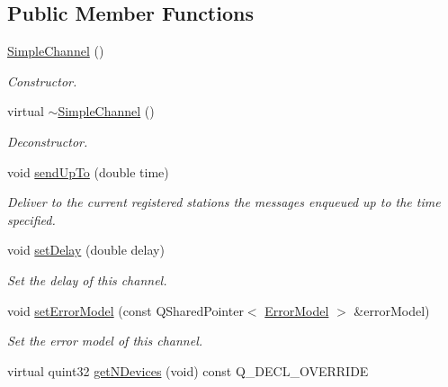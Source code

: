 \subsection*{Public Member Functions}
\begin{DoxyCompactItemize}
\item 
\hyperlink{classSimpleChannel_a0152fac3eaebcbd4050231ea223d4312}{Simple\+Channel} ()\hypertarget{classSimpleChannel_a0152fac3eaebcbd4050231ea223d4312}{}\label{classSimpleChannel_a0152fac3eaebcbd4050231ea223d4312}

\begin{DoxyCompactList}\small\item\em Constructor. \end{DoxyCompactList}\item 
virtual \hyperlink{classSimpleChannel_a0fced0bc510cfd5d5054138b6b929eb2}{$\sim$\+Simple\+Channel} ()\hypertarget{classSimpleChannel_a0fced0bc510cfd5d5054138b6b929eb2}{}\label{classSimpleChannel_a0fced0bc510cfd5d5054138b6b929eb2}

\begin{DoxyCompactList}\small\item\em Deconstructor. \end{DoxyCompactList}\item 
void \hyperlink{classSimpleChannel_af532431db230ffe67431dad38b31cc87}{send\+Up\+To} (double time)
\begin{DoxyCompactList}\small\item\em Deliver to the current registered stations the messages enqueued up to the time specified. \end{DoxyCompactList}\item 
void \hyperlink{classSimpleChannel_a334d0c084b7240cb64d61d06468ddba8}{set\+Delay} (double delay)
\begin{DoxyCompactList}\small\item\em Set the delay of this channel. \end{DoxyCompactList}\item 
void \hyperlink{classSimpleChannel_a95450daefc5d4d363170948eae9ca75b}{set\+Error\+Model} (const Q\+Shared\+Pointer$<$ \hyperlink{classErrorModel}{Error\+Model} $>$ \&error\+Model)
\begin{DoxyCompactList}\small\item\em Set the error model of this channel. \end{DoxyCompactList}\item 
virtual quint32 \hyperlink{classSimpleChannel_a6e2407c25fa79ff9f0a22fa1bd65f1d7}{get\+N\+Devices} (void) const Q\+\_\+\+D\+E\+C\+L\+\_\+\+O\+V\+E\+R\+R\+I\+DE
\end{DoxyCompactItemize}
